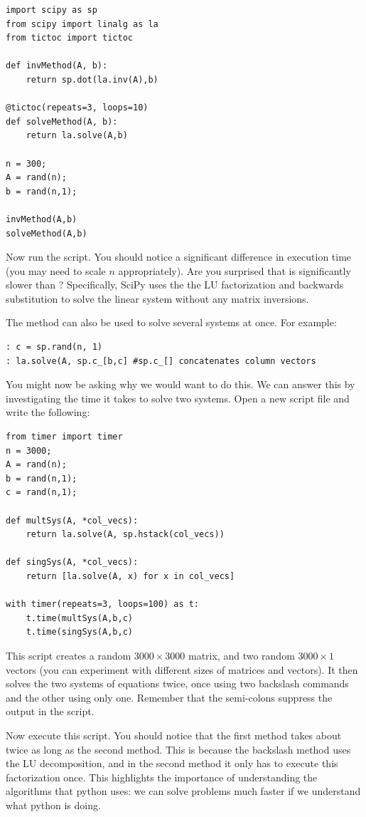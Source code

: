 \begin{lstlisting}
import scipy as sp
from scipy import linalg as la
from tictoc import tictoc

def invMethod(A, b):
    return sp.dot(la.inv(A),b)

@tictoc(repeats=3, loops=10)
def solveMethod(A, b):
    return la.solve(A,b)
    
n = 300;
A = rand(n);
b = rand(n,1);

invMethod(A,b)
solveMethod(A,b)
\end{lstlisting}

Now run the script. You should notice a significant difference in execution time
(you may need to scale $n$ appropriately). Are you surprised that  is significantly slower than ?  Specifically, SciPy uses the
the LU factorization and backwards substitution to solve the linear system
without any matrix inversions. %

The  method can also be used to solve several systems at once. For example:

\begin{lstlisting}
: c = sp.rand(n, 1)
: la.solve(A, sp.c_[b,c] #sp.c_[] concatenates column vectors
\end{lstlisting}

You might now be asking why we would want to do this. We can answer this by
investigating the time it takes to solve two systems. Open a new script file and
write the following:

\begin{lstlisting}
from timer import timer
n = 3000;
A = rand(n);
b = rand(n,1);
c = rand(n,1);

def multSys(A, *col_vecs):
    return la.solve(A, sp.hstack(col_vecs))
    
def singSys(A, *col_vecs):
    return [la.solve(A, x) for x in col_vecs]

with timer(repeats=3, loops=100) as t:
    t.time(multSys(A,b,c)
    t.time(singSys(A,b,c)
\end{lstlisting}

This script creates a random $3000 \times 3000$ matrix, and two random $3000
\times 1$ vectors (you can experiment with different sizes of matrices and
vectors). It then solves the two systems of equations twice, once using two
backslash commands and the other using only one. Remember that the semi-colons
suppress the output in the script.

Now execute this script. You should notice that the first method takes about
twice as long as the second method. This is because the backslash method uses
the LU decomposition, and in the second method it only has to execute this
factorization once. This highlights the importance of understanding the
algorithms that python uses: we can solve problems much faster if we understand
what python is doing.

